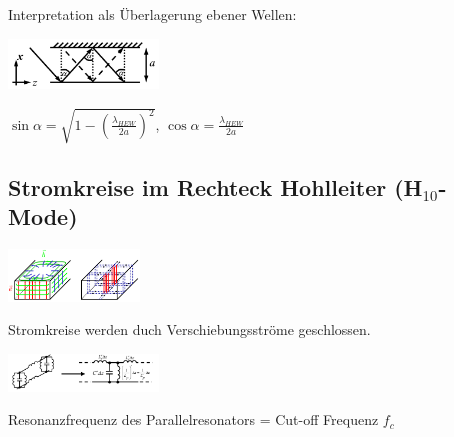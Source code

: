 \documentclass[english]{latex4ei/latex4ei_sheet}
\begin{document}
\begin{sectionbox}
    Interpretation als Überlagerung ebener Wellen:\\
    \begin{center}\includegraphics[width = 4cm]{./img/hohlleiter-reflexion.png}\end{center}
    $\sin \alpha=\sqrt{1-\left(\frac{\lambda_{H E W}}{2 a}\right)^{2}}$, $\cos \alpha=\frac{\lambda_{H E W}}{2 a}$\\
\end{sectionbox}

\begin{sectionbox}
    \subsection{Stromkreise im Rechteck Hohlleiter (H$_{10}$-Mode)}
    \begin{center}\includegraphics[width = 3.5cm]{./img/stromkreise-hl.jpeg}\end{center}
    Stromkreise werden duch Verschiebungsströme geschlossen.
    \begin{center}\includegraphics[width = 4cm]{./img/strom-hl.jpeg}\end{center}
    Resonanzfrequenz des Parallelresonators = Cut-off Frequenz $f_c$
\end{sectionbox}
\end{document}
